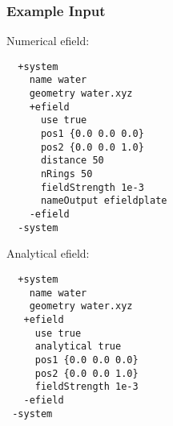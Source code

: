 \documentclass[bibliography=totocnumbered,a4paper,10pt,oneside]{scrbook}
\begin{document}
\subsubsection{Example Input}
Numerical efield:
\begin{lstlisting}
  +system
    name water 
    geometry water.xyz
    +efield
      use true
      pos1 {0.0 0.0 0.0}
      pos2 {0.0 0.0 1.0}
      distance 50
      nRings 50
      fieldStrength 1e-3
      nameOutput efieldplate
    -efield
  -system
 \end{lstlisting}
Analytical efield:
\begin{lstlisting}
  +system
    name water 
    geometry water.xyz
   +efield
     use true
     analytical true
     pos1 {0.0 0.0 0.0}
     pos2 {0.0 0.0 1.0}
     fieldStrength 1e-3
   -efield
 -system
\end{lstlisting}
\end{document}

